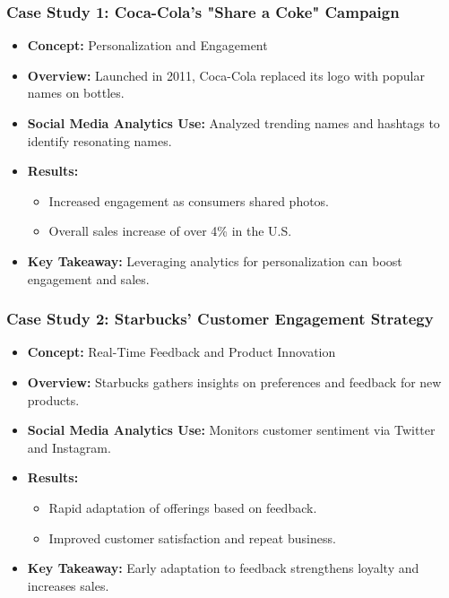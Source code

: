 \documentclass{beamer}
\begin{document}
\begin{frame}[fragile]
    \frametitle{Case Study 1: Coca-Cola's "Share a Coke" Campaign}
    \begin{itemize}
        \item \textbf{Concept:} Personalization and Engagement
        \item \textbf{Overview:} Launched in 2011, Coca-Cola replaced its logo with popular names on bottles.
        \item \textbf{Social Media Analytics Use:} Analyzed trending names and hashtags to identify resonating names.
        \item \textbf{Results:}
            \begin{itemize}
                \item Increased engagement as consumers shared photos.
                \item Overall sales increase of over 4\% in the U.S.
            \end{itemize}
        \item \textbf{Key Takeaway:} Leveraging analytics for personalization can boost engagement and sales.
    \end{itemize}
\end{frame}

\begin{frame}[fragile]
    \frametitle{Case Study 2: Starbucks' Customer Engagement Strategy}
    \begin{itemize}
        \item \textbf{Concept:} Real-Time Feedback and Product Innovation
        \item \textbf{Overview:} Starbucks gathers insights on preferences and feedback for new products.
        \item \textbf{Social Media Analytics Use:} Monitors customer sentiment via Twitter and Instagram.
        \item \textbf{Results:}
            \begin{itemize}
                \item Rapid adaptation of offerings based on feedback.
                \item Improved customer satisfaction and repeat business.
            \end{itemize}
        \item \textbf{Key Takeaway:} Early adaptation to feedback strengthens loyalty and increases sales.
    \end{itemize}
\end{frame}
\end{document}
